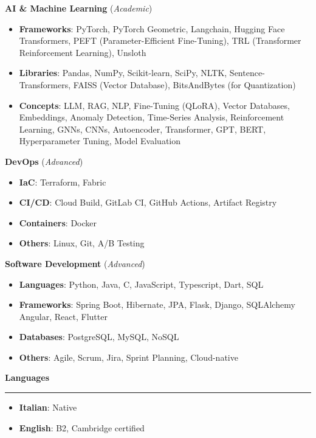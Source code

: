 \documentclass[9pt, a4paper]{article}
\newcommand{\cvsection}[1]{%
	\vspace{2pt}\par
	{\Large\bfseries\color{sectionblue}#1}\par
	\vspace{2pt}\hrule\vspace{6pt}
}
\begin{document}
\begin{minipage}[t]{0.32\linewidth}
		{\bfseries AI \& Machine Learning} (\textit{Academic})
		\begin{itemize}[leftmargin=*, nosep, itemsep=2pt]
			\footnotesize
			\item \textbf{Frameworks}: PyTorch, PyTorch Geometric, Langchain, Hugging Face Transformers, PEFT (Parameter-Efficient Fine-Tuning), TRL (Transformer Reinforcement Learning), Unsloth
			
			\item \textbf{Libraries}: Pandas, NumPy, Scikit-learn, SciPy, NLTK, Sentence-Transformers, FAISS (Vector Database), BitsAndBytes (for Quantization) 
			
			\item \textbf{Concepts}: LLM, RAG, NLP, Fine-Tuning (QLoRA), Vector Databases, Embeddings, Anomaly Detection, Time-Series Analysis, Reinforcement Learning, GNNs, CNNs, Autoencoder, Transformer, GPT, BERT, Hyperparameter Tuning, Model Evaluation
		\end{itemize}
		\vspace{4pt}
		
		{\bfseries DevOps} (\textit{Advanced})
		\begin{itemize}[leftmargin=*, nosep, itemsep=2pt]
			\footnotesize
			\item \textbf{IaC}: Terraform, Fabric
			\item \textbf{CI/CD}: Cloud Build, GitLab CI, GitHub Actions, Artifact Registry
			\item \textbf{Containers}: Docker
			\item \textbf{Others}: Linux, Git, A/B Testing
		\end{itemize}
		\vspace{4pt}
		
		{\bfseries Software Development} (\textit{Advanced})
		\begin{itemize}[leftmargin=*, nosep, itemsep=2pt]
			\footnotesize
			\item \textbf{Languages}: Python, Java, C, JavaScript, Typescript, Dart, SQL
			\item \textbf{Frameworks}: Spring Boot, Hibernate, JPA, Flask, Django, SQLAlchemy Angular, React, Flutter
			\item \textbf{Databases}: PostgreSQL, MySQL, NoSQL
			\item \textbf{Others}: Agile, Scrum, Jira, Sprint Planning, Cloud-native
		\end{itemize}
		\vspace{7pt}
		
		\cvsection{Languages}
		\begin{itemize}[leftmargin=*, nosep, itemsep=2pt]
			\item \textbf{Italian}: Native
			\item \textbf{English}: B2, Cambridge certified
		\end{itemize}
		
	\end{minipage}
	
\end{document}
